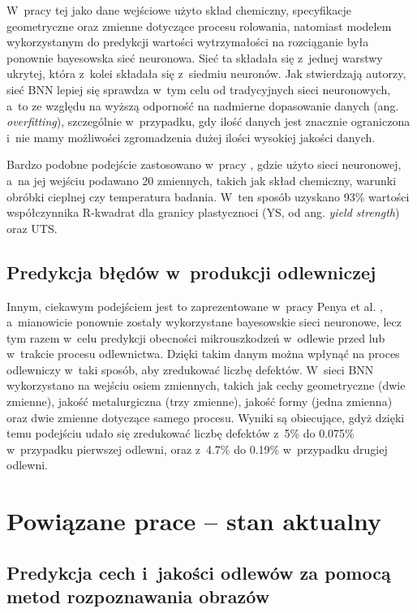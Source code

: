 \noindent W~pracy tej jako dane wejściowe użyto skład chemiczny, specyfikacje geometryczne oraz zmienne dotyczące procesu rolowania, natomiast modelem wykorzystanym do predykcji wartości wytrzymałości na rozciąganie była ponownie bayesowska sieć neuronowa. Sieć ta składała się z~jednej warstwy ukrytej, która z~kolei składała się z~siedmiu neuronów. Jak stwierdzają autorzy, sieć BNN lepiej się sprawdza w~tym celu od tradycyjnych sieci neuronowych, a~to ze względu na wyższą odporność na nadmierne dopasowanie danych (ang. \textit{overfitting}), szczególnie w~przypadku, gdy ilość danych jest znacznie ograniczona i~nie mamy możliwości zgromadzenia dużej ilości wysokiej jakości danych.
    
Bardzo podobne podejście zastosowano w~pracy \cite{Wang20}, gdzie użyto sieci neuronowej, a~na jej wejściu podawano 20 zmiennych, takich jak skład chemiczny, warunki obróbki cieplnej czy temperatura badania. W~ten sposób uzyskano 93\% wartości współczynnika R-kwadrat dla granicy plastycznoci (YS, od ang. \textit{yield strength}) oraz UTS.

\subsection{Predykcja błędów w~produkcji odlewniczej}
\label{sub:predykcja.2}

Innym, ciekawym podejściem jest to zaprezentowane w~pracy Penya et al. \cite{Yoseba08}, a~mianowicie ponownie zostały wykorzystane bayesowskie sieci neuronowe, lecz tym razem w~celu predykcji obecności mikrouszkodzeń w~odlewie przed lub w~trakcie procesu odlewnictwa. Dzięki takim danym można wpłynąć na proces odlewniczy w~taki sposób, aby zredukować liczbę defektów. W~sieci BNN wykorzystano na wejściu osiem zmiennych, takich jak cechy geometryczne (dwie zmienne), jakość metalurgiczna (trzy zmienne), jakość formy (jedna zmienna) oraz dwie zmienne dotyczące samego procesu. Wyniki są obiecujące, gdyż dzięki temu podejściu udało się zredukować liczbę defektów z~5\% do 0.075\% w~przypadku pierwszej odlewni, oraz z~4.7\% do 0.19\% w~przypadku drugiej odlewni.

\section{Powiązane prace – stan aktualny}
\label{sec:stan.aktualny}

\subsection{Predykcja cech i~jakości odlewów za pomocą metod rozpoznawania obrazów}
\label{sub:predykcja.3}

